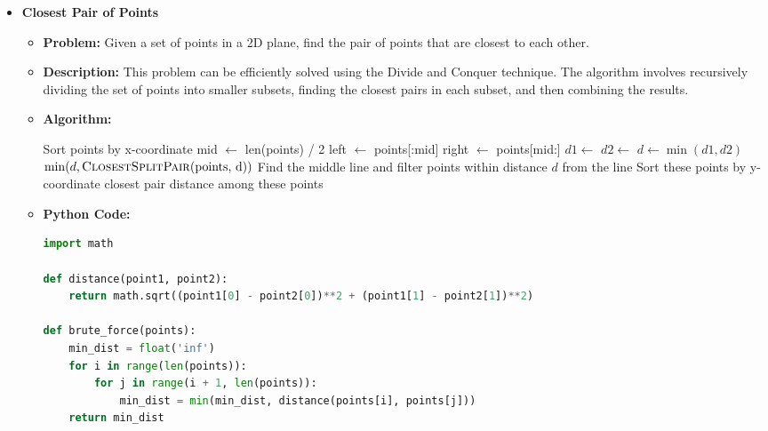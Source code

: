 \documentclass[12pt]{book} %
\begin{document}
\begin{itemize}
\begin{itemize}
\begin{lstlisting}[language=Python]
array = [38, 27, 43, 3, 9, 82, 10]
merge_sort(array)
print(array)
        \end{lstlisting}
    \item \textbf{Closest Pair of Points}
        \begin{itemize}
        \item \textbf{Problem:} Given a set of points in a 2D plane, find the pair of points that are closest to each other.
        \item \textbf{Description:} This problem can be efficiently solved using the Divide and Conquer technique. The algorithm involves recursively dividing the set of points into smaller subsets, finding the closest pairs in each subset, and then combining the results.
        \item \textbf{Algorithm:}
            \begin{algorithm}[H]
            \caption{Closest Pair of Points}
            \begin{algorithmic}[1]
                \State Sort points by x-coordinate
                \State \Return {}
            \EndProcedure
                    \State \Return {}
                \EndIf
                \State mid $\gets$ len(points) / 2
                \State left $\gets$ points[:mid]
                \State right $\gets$ points[mid:]
                \State $d1 \gets$ 
                \State $d2 \gets$ 
                \State $d \gets \min(d1, d2)$
            \State \Return $\min(d, \text{\Call{ClosestSplitPair}{points, d}})$
        \EndProcedure
            \State Find the middle line and filter points within distance $d$ from the line
            \State Sort these points by y-coordinate
            \State \Return closest pair distance among these points
        \EndProcedure
                \State {}
            \EndProcedure
            \end{algorithmic}
            \end{algorithm}
        \item \textbf{Python Code:}
        \begin{lstlisting}[language=Python]
import math

def distance(point1, point2):
    return math.sqrt((point1[0] - point2[0])**2 + (point1[1] - point2[1])**2)

def brute_force(points):
    min_dist = float('inf')
    for i in range(len(points)):
        for j in range(i + 1, len(points)):
            min_dist = min(min_dist, distance(points[i], points[j]))
    return min_dist
        \end{lstlisting}
        \end{itemize}
    \end{itemize}
\end{itemize}
\end{document}
